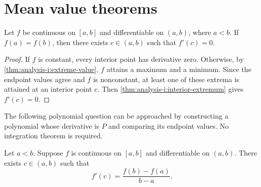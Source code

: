 \section{Mean value theorems}
\label{sec:analysis-i:mean-value-theorems}

\begin{theorem}
  \label{thm:analysis-i:rolle}
  Let $f$ be continuous on $[a,b]$ and differentiable on $(a,b)$,
  where $a<b$. If $f(a)=f(b)$, then there exists
  $c\in(a,b)$ such that $f'(c)=0$.
\end{theorem}
\begin{proof}
  If $f$ is constant, every interior point has derivative zero.
  Otherwise, by \autoref{thm:analysis-i:extreme-value}, $f$ attains a
  maximum and a minimum. Since the endpoint values agree and $f$ is
  nonconstant, at least one of these extrema is attained at an interior
  point $c$. Then \autoref{thm:analysis-i:interior-extremum} gives
  $f'(c)=0$.
\end{proof}

The following polynomial question can be approached
by constructing a polynomial whose derivative is $P$ and comparing its
endpoint values. No integration theorem is required.


\begin{theorem}
  \label{thm:analysis-i:mean-value}
  Let $a<b$. Suppose $f$ is continuous on $[a,b]$
  and differentiable on $(a,b)$. There exists $c\in(a,b)$ such that
  \[
    f'(c)=\frac{f(b)-f(a)}{b-a}.
  \]
\end{theorem}

